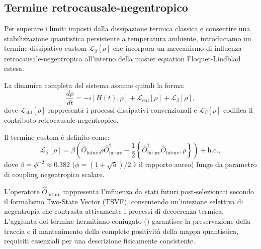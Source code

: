 \documentclass[11pt,a4paper]{article}
\theoremstyle{plain}
\theoremstyle{definition}
\begin{document}
\vspace{0.4cm}


\subsection{Termine retrocausale-negentropico}
\label{subsec:retro_term}

Per superare i limiti imposti dalla dissipazione termica classica e consentire una stabilizzazione quantistica persistente a temperatura ambiente, introduciamo un termine dissipativo custom $\mathcal{L}_\beta[\rho]$ che incorpora un meccanismo di influenza retrocausale-negentropica all'interno della master equation Floquet-Lindblad estesa.

\vspace{0.2cm}

La dinamica completa del sistema assume quindi la forma:
\begin{equation}
\frac{d\rho}{dt} = -i [H(t),\rho] + \mathcal{L}_{\text{std}}[\rho] + \mathcal{L}_\beta[\rho],
\label{eq:master_eq}
\end{equation}
dove $\mathcal{L}_{\text{std}}[\rho]$ rappresenta i processi dissipativi convenzionali e $\mathcal{L}_\beta[\rho]$ codifica il contributo retrocausale-negentropico.


\vspace{0.3cm}

\begin{tcolorbox}[colback=blue!3!white, colframe=blue!80!black, title={\textbf{Termine dissipativo retrocausale-negentropico $\mathcal{L}_\beta[\rho]$}}, sharp corners, boxrule=0.9pt, coltitle=white]
Il termine custom è definito come:
\begin{equation}
\mathcal{L}_\beta[\rho] = \beta \left( \hat{O}_{\text{future}} \rho \hat{O}_{\text{future}}^\dagger - \frac{1}{2} \left\{ \hat{O}_{\text{future}}^\dagger \hat{O}_{\text{future}}, \rho \right\} \right) + \text{h.c.},
\label{eq:L_beta}
\end{equation}
dove $\beta = \phi^{-2} \approx 0.382$ ($\phi = (1 + \sqrt{5})/2$ è il rapporto aureo) funge da parametro di coupling negentropico scalare. 

L'operatore $\hat{O}_{\text{future}}$ rappresenta l'influenza da stati futuri post-selezionati secondo il formalismo Two-State Vector (TSVF), consentendo un'iniezione selettiva di negentropia che contrasta attivamente i processi di decoerenza termica. L'aggiunta del termine hermitiano coniugato () garantisce la preservazione della traccia e il mantenimento della complete positività della mappa quantistica, requisiti essenziali per una descrizione fisicamente consistente.
\end{tcolorbox}
\end{document}
